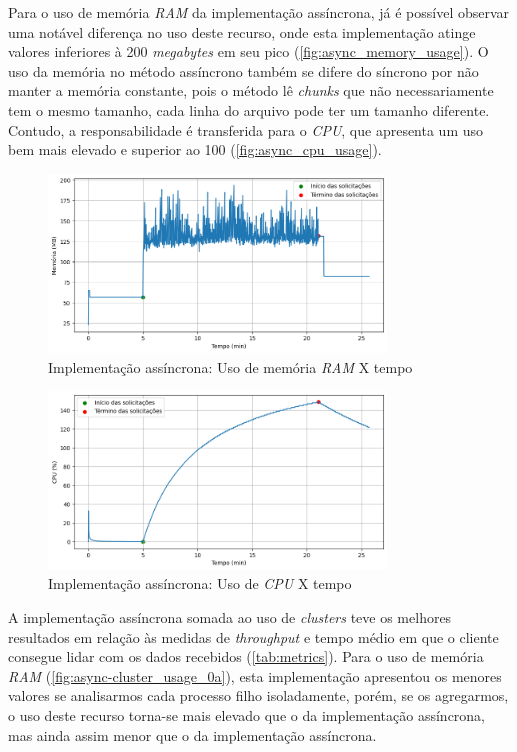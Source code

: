 \documentclass[12pt]{article}
\begin{document}
Para o uso de memória \textit{RAM} da implementação assíncrona, já é possível
observar uma notável diferença no uso deste recurso, onde esta implementação 
atinge valores inferiores à 200 \textit{megabytes} em seu pico
(\autoref{fig:async_memory_usage}). O uso da memória no método assíncrono também se
difere do síncrono por não manter a memória constante, pois o método lê \textit{chunks}
que não necessariamente tem o mesmo tamanho, cada linha do arquivo pode ter um
tamanho diferente. Contudo, a responsabilidade é transferida para o \textit{CPU},
que apresenta um uso bem mais elevado e superior ao 100\text{\%} (\autoref{fig:async_cpu_usage}).


\begin{figure}[H]
\centering
\includegraphics[width=0.8\textwidth]{images/pt-br/results/async_memory_usage.png}
\caption{Implementação assíncrona: Uso de memória \textit{RAM} X tempo}\label{fig:async_memory_usage}
\end{figure}



\begin{figure}[H]
\centering
\includegraphics[width=0.8\textwidth]{images/pt-br/results/async_cpu_usage.png}
\caption{Implementação assíncrona: Uso de \textit{CPU} X tempo}\label{fig:async_cpu_usage}
\end{figure}


A implementação assíncrona somada ao uso de \textit{clusters} teve os melhores resultados
em relação às medidas de \textit{throughput} e tempo médio em que o cliente consegue lidar com os dados recebidos (\autoref{tab:metrics}). 
Para o uso de memória \textit{RAM} (\autoref{fig:async-cluster_usage_0a}), esta implementação
apresentou os menores valores se analisarmos cada processo filho isoladamente, porém, se os
agregarmos, o uso deste recurso torna-se mais elevado que o da implementação assíncrona, mas
ainda assim menor que o da implementação assíncrona.
\end{document}
